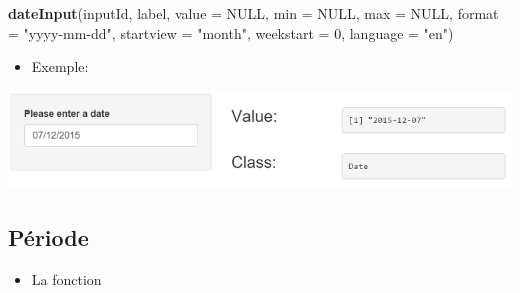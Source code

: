 \documentclass[]{article}
\newenvironment{Shaded}{\begin{snugshade}}{\end{snugshade}}
\newcommand{\KeywordTok}[1]{\textcolor[rgb]{0.13,0.29,0.53}{\textbf{#1}}}
\newcommand{\DataTypeTok}[1]{\textcolor[rgb]{0.13,0.29,0.53}{#1}}
\newcommand{\DecValTok}[1]{\textcolor[rgb]{0.00,0.00,0.81}{#1}}
\newcommand{\StringTok}[1]{\textcolor[rgb]{0.31,0.60,0.02}{#1}}
\newcommand{\CommentTok}[1]{\textcolor[rgb]{0.56,0.35,0.01}{\textit{#1}}}
\newcommand{\OtherTok}[1]{\textcolor[rgb]{0.56,0.35,0.01}{#1}}
\newcommand{\NormalTok}[1]{#1}
\providecommand{\tightlist}{%
  \setlength{\itemsep}{0pt}\setlength{\parskip}{0pt}}
\begin{document}
\begin{Shaded}
\begin{Highlighting}[]
\KeywordTok{dateInput}\NormalTok{(inputId, label, }\DataTypeTok{value =} \OtherTok{NULL}\NormalTok{, }\DataTypeTok{min =} \OtherTok{NULL}\NormalTok{, }\DataTypeTok{max =} \OtherTok{NULL}\NormalTok{, }\DataTypeTok{format =} \StringTok{"yyyy-mm-dd"}\NormalTok{, }
          \DataTypeTok{startview =} \StringTok{"month"}\NormalTok{, }\DataTypeTok{weekstart =} \DecValTok{0}\NormalTok{, }\DataTypeTok{language =} \StringTok{"en"}\NormalTok{)}
\end{Highlighting}
\end{Shaded}

\begin{itemize}
\tightlist
\item
  Exemple:
\end{itemize}

\begin{Shaded}
\end{Shaded}

\includegraphics{img/date.png}

\subsection{Période}\label{periode}

\begin{itemize}
\tightlist
\item
  La fonction
\end{itemize}
\end{document}
